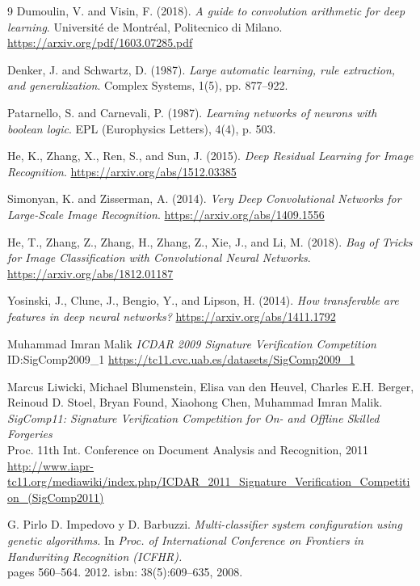 \begin{thebibliography}{9}
Dumoulin, V. and Visin, F. (2018).
\textit{A guide to convolution arithmetic for deep learning}.
Université de Montréal, Politecnico di Milano.
\url{https://arxiv.org/pdf/1603.07285.pdf}

Denker, J. and Schwartz, D. (1987).
\textit{Large automatic learning, rule extraction, and generalization}.
Complex Systems, 1(5), pp. 877–922.

Patarnello, S. and Carnevali, P. (1987).
\textit{Learning networks of neurons with boolean logic}.
EPL (Europhysics Letters), 4(4), p. 503.

He, K., Zhang, X., Ren, S., and Sun, J. (2015).
\textit{Deep Residual Learning for Image Recognition}.
\url{https://arxiv.org/abs/1512.03385}

Simonyan, K. and Zisserman, A. (2014).
\textit{Very Deep Convolutional Networks for Large-Scale Image Recognition}.
\url{https://arxiv.org/abs/1409.1556}

He, T., Zhang, Z., Zhang, H., Zhang, Z., Xie, J., and Li, M. (2018).
\textit{Bag of Tricks for Image Classification with Convolutional Neural Networks}.
\url{https://arxiv.org/abs/1812.01187}

Yosinski, J., Clune, J., Bengio, Y., and Lipson, H. (2014).
\textit{How transferable are features in deep neural networks?}
\url{https://arxiv.org/abs/1411.1792}


Muhammad Imran Malik
\textit{ ICDAR 2009 Signature Verification Competition } \\
ID:SigComp2009\_1
\url{https://tc11.cvc.uab.es/datasets/SigComp2009_1}

Marcus Liwicki, Michael Blumenstein, Elisa van den Heuvel, Charles E.H. Berger, Reinoud D. Stoel, Bryan Found, Xiaohong Chen, Muhammad Imran Malik.
\textit{ SigComp11: Signature Verification Competition for On- and Offline Skilled Forgeries } \\
 Proc. 11th Int. Conference on Document Analysis and Recognition, 2011
\url{http://www.iapr-tc11.org/mediawiki/index.php/ICDAR_2011_Signature_Verification_Competition_(SigComp2011)}

G. Pirlo D. Impedovo y D. Barbuzzi.
\textit{ Multi-classifier system configuration using genetic algorithms. } In \textit{Proc. of International Conference on Frontiers in Handwriting Recognition (ICFHR).} \\
pages 560–564. 2012. isbn:
38(5):609–635, 2008.


\end{thebibliography}
